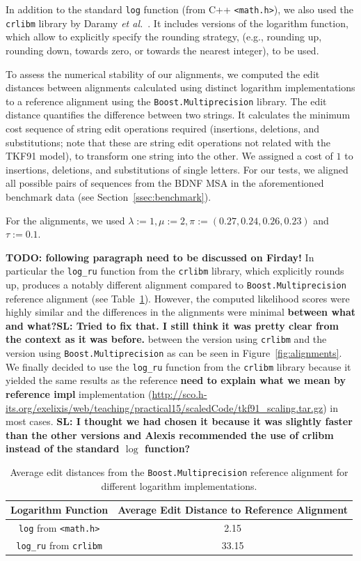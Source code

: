 \documentclass[runningheads,a4paper]{llncs}
\begin{document}
In addition to the standard \texttt{log} function (from C++ \texttt{<math.h>}),
we also used the \texttt{crlibm} library by Daramy {\em et al.}~\cite{Daramy04}.
It includes versions of the logarithm function, which allow to explicitly specify the rounding strategy, (e.g., rounding up, rounding down, towards zero, or towards the nearest integer), to be used.

To assess the numerical stability of our alignments,  we computed the edit distances between alignments calculated using distinct logarithm implementations 
to a reference alignment using the \texttt{Boost.Multiprecision} library.
The edit distance quantifies the difference between two strings. It calculates the minimum cost sequence of string edit operations required 
(insertions, deletions, and substitutions; note that these are string edit operations not related with the TKF91 model), 
to transform one string into the other. We assigned a cost of $1$ to insertions, deletions, and substitutions of single letters.
For our tests, we aligned all possible pairs of sequences from the BDNF MSA in the aforementioned benchmark data (see Section~\ref{ssec:benchmark}).

For the alignments, we used $\lambda:=1, \mu:=2, \pi:= (0.27, 0.24, 0.26, 0.23)$ and $\tau := 0.1$.

{\bf TODO: following paragraph need to be discussed on Firday!}
In particular the \texttt{log\_ru} function from the \texttt{crlibm} library, which explicitly rounds up, produces a notably different alignment compared to
\texttt{Boost.Multiprecision} reference alignment (see Table~\ref{fig:dist}).
However, the computed likelihood scores were highly similar and the differences in the alignments were minimal {\bf between what and what?}{\bf SL: Tried to fix that. I still think it was pretty clear from the context as it was before.} between the version using \texttt{crlibm} and the version using \texttt{Boost.Multiprecision} as can be seen in Figure~\ref{fig:alignments}.
We finally decided to use the \texttt{log\_ru} function from the \texttt{crlibm} library because it yielded the same results as the reference {\bf need to explain what we mean by reference impl} 
implementation
(\url{http://sco.h-its.org/exelixis/web/teaching/practical15/scaledCode/tkf91_scaling.tar.gz}) in most cases. {\bf SL: I thought we had chosen it because it was slightly faster than the other versions and Alexis recommended the use of crlibm instead of the standard $\log$ function?}

\begin{table}[h!]

\centering

\begin{tabular}{|c|c|}
\hline
Logarithm Function & Average Edit Distance to Reference Alignment\\
\hline
\texttt{log} from \texttt{<math.h>} & 2.15 \\
\hline
\texttt{log\_ru} from \texttt{crlibm} & 33.15 \\
\hline
\end{tabular}
\caption{Average edit distances from the \texttt{Boost.Multiprecision} reference alignment for different logarithm implementations.}
\label{fig:dist}
\end{table}
\end{document}
